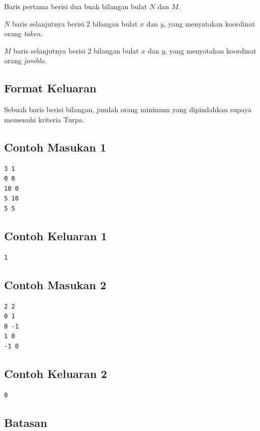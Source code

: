 \documentclass{article}
\begin{document}
\par\noindent Baris pertama berisi dua buah bilangan bulat $N$ dan $M$.
\par\noindent $N$ baris selanjutnya berisi 2 bilangan bulat $x$ dan $y$, yang menyatakan koordinat orang \textit{taken}.
\par\noindent $M$ baris selanjutnya berisi 2 bilangan bulat $x$ dan $y$, yang menyatakan koordinat orang \textit{jomblo}.

\subsection*{Format Keluaran}

\par\noindent Sebuah baris berisi bilangan, jumlah orang minimum yang dipindahkan supaya memenuhi kriteria Turpa.

\subsection*{Contoh Masukan 1}

\begin{lstlisting}
3 1
0 0
10 0
5 10
5 5
\end{lstlisting}

\subsection*{Contoh Keluaran 1}

\begin{lstlisting}
1
\end{lstlisting}

\subsection*{Contoh Masukan 2}

\begin{lstlisting}
2 2
0 1
0 -1
1 0
-1 0
\end{lstlisting}

\subsection*{Contoh Keluaran 2}

\begin{lstlisting}
0
\end{lstlisting}

\subsection*{Batasan}
\end{document}
